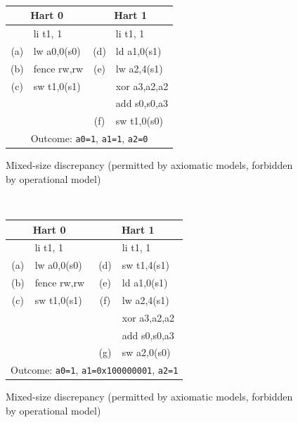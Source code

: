 \begin{figure}[h!]
  \centering\small
  {\tt
    \begin{tabular}{cl||cl}
    \multicolumn{2}{c}{Hart 0} & \multicolumn{2}{c}{Hart 1} \\
    \hline
          & li t1, 1    &     & li t1, 1      \\
      (a) & lw a0,0(s0) & (d) & ld a1,0(s1)   \\
      (b) & fence rw,rw & (e) & lw a2,4(s1)   \\
      (c) & sw t1,0(s1) &     & xor a3,a2,a2  \\
          &             &     & add s0,s0,a3  \\
          &             & (f) & sw t1,0(s0)   \\
      \hline
      \multicolumn{4}{c}{Outcome: {\tt a0=1}, {\tt a1=1}, {\tt a2=0}}
    \end{tabular}
  }
  \caption{Mixed-size discrepancy (permitted by axiomatic models, forbidden by operational model)}
  \label{fig:litmus:discrepancy:rsw2}
\end{figure}

\begin{figure}[h!]
  \centering\small
  {\tt
    \begin{tabular}{cl||cl}
    \multicolumn{2}{c}{Hart 0} & \multicolumn{2}{c}{Hart 1} \\
    \hline
          & li t1, 1    &     & li t1, 1      \\
      (a) & lw a0,0(s0) & (d) & sw t1,4(s1)   \\
      (b) & fence rw,rw & (e) & ld a1,0(s1)   \\
      (c) & sw t1,0(s1) & (f) & lw a2,4(s1)   \\
          &             &     & xor a3,a2,a2  \\
          &             &     & add s0,s0,a3  \\
          &             & (g) & sw a2,0(s0)   \\
      \hline
      \multicolumn{4}{c}{Outcome: {\tt a0=1}, {\tt a1=0x100000001}, {\tt a2=1}}
    \end{tabular}
  }
  \caption{Mixed-size discrepancy (permitted by axiomatic models, forbidden by operational model)}
  \label{fig:litmus:discrepancy:rsw3}
\end{figure}

